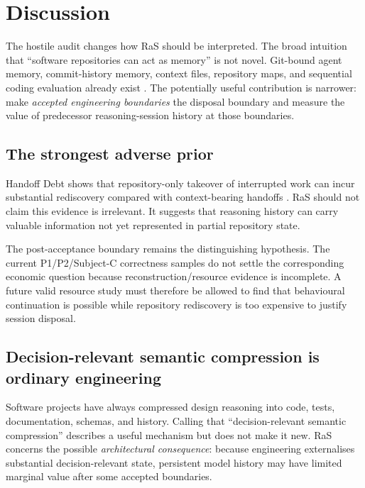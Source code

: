 \section{Discussion}
\label{sec:discussion}

The hostile audit changes how RaS should be interpreted. The broad intuition that “software repositories can act as memory” is not novel. Git-bound agent memory, commit-history memory, context files, repository maps, and sequential coding evaluation already exist \citep{guo2026gitmemory,wang2025repomemory,li2026learningcommit,shastry2026swesteps}. The potentially useful contribution is narrower: make \emph{accepted engineering boundaries} the disposal boundary and measure the value of predecessor reasoning-session history at those boundaries.

\subsection{The strongest adverse prior}

Handoff Debt shows that repository-only takeover of interrupted work can incur substantial rediscovery compared with context-bearing handoffs \citep{kc2026handoff}. RaS should not claim this evidence is irrelevant. It suggests that reasoning history can carry valuable information not yet represented in partial repository state.

The post-acceptance boundary remains the distinguishing hypothesis. The current P1/P2/Subject-C correctness samples do not settle the corresponding economic question because reconstruction/resource evidence is incomplete. A future valid resource study must therefore be allowed to find that behavioural continuation is possible while repository rediscovery is too expensive to justify session disposal.

\subsection{Decision-relevant semantic compression is ordinary engineering}

Software projects have always compressed design reasoning into code, tests, documentation, schemas, and history. Calling that “decision-relevant semantic compression” describes a useful mechanism but does not make it new. RaS concerns the possible \emph{architectural consequence}: because engineering externalises substantial decision-relevant state, persistent model history may have limited marginal value after some accepted boundaries.

